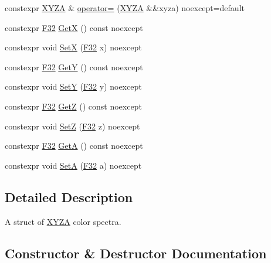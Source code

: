 \begin{DoxyCompactItemize}
constexpr \mbox{\hyperlink{structmage_1_1_x_y_z_a}{X\+Y\+ZA}} \& \mbox{\hyperlink{structmage_1_1_x_y_z_a_a15556bcc4521264fc3edfc1b4f1a595a}{operator=}} (\mbox{\hyperlink{structmage_1_1_x_y_z_a}{X\+Y\+ZA}} \&\&xyza) noexcept=default
\item 
constexpr \mbox{\hyperlink{namespacemage_aa97e833b45f06d60a0a9c4fc22ae02c0}{F32}} \mbox{\hyperlink{structmage_1_1_x_y_z_a_ad8a87f85d80f41961d88657150d62d83}{GetX}} () const noexcept
\item 
constexpr void \mbox{\hyperlink{structmage_1_1_x_y_z_a_ae94002f96c710ac074672736e5f96a53}{SetX}} (\mbox{\hyperlink{namespacemage_aa97e833b45f06d60a0a9c4fc22ae02c0}{F32}} x) noexcept
\item 
constexpr \mbox{\hyperlink{namespacemage_aa97e833b45f06d60a0a9c4fc22ae02c0}{F32}} \mbox{\hyperlink{structmage_1_1_x_y_z_a_a218a44b26cb020ff6ebd730772425097}{GetY}} () const noexcept
\item 
constexpr void \mbox{\hyperlink{structmage_1_1_x_y_z_a_a2e1669b43888849e7b8ecff3619b3f61}{SetY}} (\mbox{\hyperlink{namespacemage_aa97e833b45f06d60a0a9c4fc22ae02c0}{F32}} y) noexcept
\item 
constexpr \mbox{\hyperlink{namespacemage_aa97e833b45f06d60a0a9c4fc22ae02c0}{F32}} \mbox{\hyperlink{structmage_1_1_x_y_z_a_a951b69d9024672c0d59f81e15c9f7f6b}{GetZ}} () const noexcept
\item 
constexpr void \mbox{\hyperlink{structmage_1_1_x_y_z_a_aabbeb3087741702e0d94ec989b516652}{SetZ}} (\mbox{\hyperlink{namespacemage_aa97e833b45f06d60a0a9c4fc22ae02c0}{F32}} z) noexcept
\item 
constexpr \mbox{\hyperlink{namespacemage_aa97e833b45f06d60a0a9c4fc22ae02c0}{F32}} \mbox{\hyperlink{structmage_1_1_x_y_z_a_a97ee3d29d5a8f2b7cd005458fc5a2f25}{GetA}} () const noexcept
\item 
constexpr void \mbox{\hyperlink{structmage_1_1_x_y_z_a_abbf1fe2475252fc2fa62588de5534dee}{SetA}} (\mbox{\hyperlink{namespacemage_aa97e833b45f06d60a0a9c4fc22ae02c0}{F32}} a) noexcept
\end{DoxyCompactItemize}


\subsection{Detailed Description}
A struct of \mbox{\hyperlink{structmage_1_1_x_y_z_a}{X\+Y\+ZA}} color spectra. 

\subsection{Constructor \& Destructor Documentation}
\mbox{\label{structmage_1_1_x_y_z_a_ab954075ab032465c9199870646a2718b}} 
